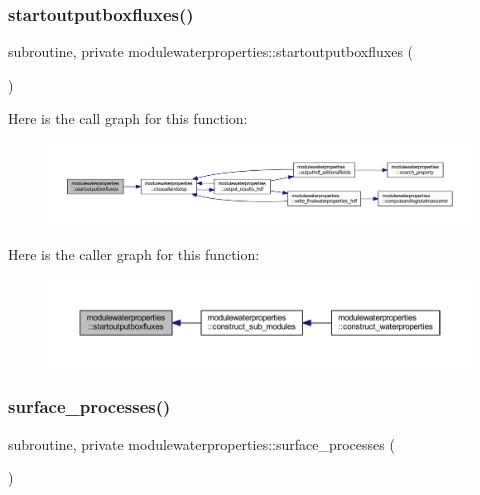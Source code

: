 \subsubsection{\texorpdfstring{startoutputboxfluxes()}{startoutputboxfluxes()}}
{\footnotesize\ttfamily subroutine, private modulewaterproperties\+::startoutputboxfluxes (\begin{DoxyParamCaption}{ }\end{DoxyParamCaption})\hspace{0.3cm}{\ttfamily [private]}}

Here is the call graph for this function\+:\nopagebreak
\begin{figure}[H]
\begin{center}
\leavevmode
\includegraphics[width=350pt]{namespacemodulewaterproperties_ab589508866130f683e9d48bc7aeb235c_cgraph}
\end{center}
\end{figure}
Here is the caller graph for this function\+:\nopagebreak
\begin{figure}[H]
\begin{center}
\leavevmode
\includegraphics[width=350pt]{namespacemodulewaterproperties_ab589508866130f683e9d48bc7aeb235c_icgraph}
\end{center}
\end{figure}
\mbox{\label{namespacemodulewaterproperties_a3741d54f8b36c751fb10748ab34af465}} 
\subsubsection{\texorpdfstring{surface\+\_\+processes()}{surface\_processes()}}
{\footnotesize\ttfamily subroutine, private modulewaterproperties\+::surface\+\_\+processes (\begin{DoxyParamCaption}{ }\end{DoxyParamCaption})\hspace{0.3cm}{\ttfamily [private]}}

